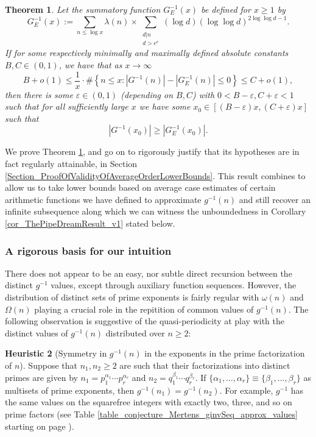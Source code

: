 \documentclass[11pt,reqno,a4letter]{article}
\numberwithin{figure}{section}
\numberwithin{table}{section}
\theoremstyle{plain}
\newtheorem{theorem}{Theorem}
\numberwithin{theorem}{section}
\theoremstyle{definition}
\newtheorem{heuristic}[theorem]{Heuristic}
\begin{document}
\begin{theorem} 
\label{theorem_CondAvgOrderGInvxSummatoryFunc_v1} 
Let the summatory function $G_E^{-1}(x)$ be defined for $x \geq 1$ by 
\begin{equation} 
\label{eqn_GEInvxSummatoryFuncDef_v1} 
G_E^{-1}(x) := \sum_{n \leq \log x} \lambda(n) \times \sum_{\substack{d|n \\ d > e^e}} 
     (\log d) (\log\log d)^{2\log\log d - 1}. 
\end{equation} 
If for some respectively minimally and maximally defined absolute constants 
$B, C \in (0, 1)$, we have that as $x \rightarrow \infty$
\[
B + o(1) \leq \frac{1}{x} \cdot \#\left\{n \leq x: |G^{-1}(n)| - |G_E^{-1}(n)| \leq 0\right\} \leq 
     C + o(1), 
\]
then there is some $\varepsilon \in (0, 1)$ (depending on $B,C$) with 
$0 < B - \varepsilon, C+\varepsilon < 1$ such that 
for all sufficiently large $x$ we have some 
$x_0 \in [(B - \varepsilon) x, (C + \varepsilon) x]$ such that 
\[
|G^{-1}(x_0)| \geq \left\lvert G_E^{-1}(x_0) \right\rvert. 
\]
\end{theorem} 
We prove Theorem \ref{theorem_CondAvgOrderGInvxSummatoryFunc_v1}, and go on to 
rigorously justify that its hypotheses are in fact regularly attainable, in 
Section \ref{Section_ProofOfValidityOfAverageOrderLowerBounds}.  
This result combines to allow us to take lower bounds based on average case estimates of 
certain arithmetic functions we have defined to approximate $g^{-1}(n)$ and still recover 
an infinite subsequence along which we can witness the unboundedness in 
Corollary \ref{cor_ThePipeDreamResult_v1} stated below. 

\subsubsection{A rigorous basis for our intuition} 

There does not appear to be an easy, nor subtle 
direct recursion between the distinct $g^{-1}$ values, except through auxiliary function sequences. 
However, the distribution of distinct sets of prime exponents is fairly regular with 
$\omega(n)$ and $\Omega(n)$ playing a crucial role in the repitition of common values of 
$g^{-1}(n)$. 
The following observation is suggestive of the quasi-periodicity at play 
with the distinct values of $g^{-1}(n)$ distributed over $n \geq 2$: 

\begin{heuristic}[Symmetry in $g^{-1}(n)$ in the exponents in the prime factorization of $n$] 
Suppose that $n_1, n_2 \geq 2$ are such that their factorizations into distinct primes are 
given by $n_1 = p_1^{\alpha_1} \cdots p_r^{\alpha_r}$ and $n_2 = q_1^{\beta_1} \cdots q_r^{\beta_r}$. 
If $\{\alpha_1, \ldots, \alpha_r\} \equiv \{\beta_1, \ldots, \beta_r\}$ as multisets of prime exponents, 
then $g^{-1}(n_1) = g^{-1}(n_2)$. For example, $g^{-1}$ has the same values on the squarefree integers 
with exactly two, three, and so on prime factors 
(see Table \ref{table_conjecture_Mertens_ginvSeq_approx_values} starting on page 
\pageref{table_conjecture_Mertens_ginvSeq_approx_values}). 
\end{heuristic} 
\end{document}
